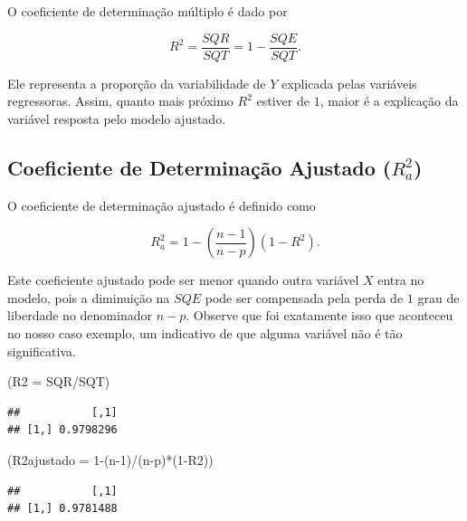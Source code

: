 \documentclass[
]{book}
\newenvironment{Shaded}{\begin{snugshade}}{\end{snugshade}}
\newcommand{\AttributeTok}[1]{\textcolor[rgb]{0.77,0.63,0.00}{#1}}
\newcommand{\DecValTok}[1]{\textcolor[rgb]{0.00,0.00,0.81}{#1}}
\newcommand{\NormalTok}[1]{#1}
\newcommand{\SpecialCharTok}[1]{\textcolor[rgb]{0.00,0.00,0.00}{#1}}
\begin{document}
O coeficiente de determinação múltiplo é dado por

\[R^2 = \frac{SQR}{SQT} = 1-\frac{SQE}{SQT}.\]

Ele representa a proporção da variabilidade de \(Y\) explicada pelas variáveis regressoras. Assim, quanto mais próximo \(R^2\) estiver de \(1\), maior é a explicação da variável resposta pelo modelo ajustado.

\hypertarget{coeficiente-de-determinauxe7uxe3o-ajustado-r2_a}{%
\subsection{\texorpdfstring{Coeficiente de Determinação Ajustado (\(R^2_a\))}{Coeficiente de Determinação Ajustado (R\^{}2\_a)}}\label{coeficiente-de-determinauxe7uxe3o-ajustado-r2_a}}

O coeficiente de determinação ajustado é definido como

\[R^2_a=1-\left(\frac{n-1}{n-p}\right)(1-R^2).\]

Este coeficiente ajustado pode ser menor quando outra variável \(X\) entra no modelo, pois a diminuição na \(SQE\) pode ser compensada pela perda de \(1\) grau de liberdade no denominador \(n-p\). Observe que foi exatamente isso que aconteceu no nosso caso exemplo, um indicativo de que alguma variável não é tão significativa.

\begin{Shaded}
\begin{Highlighting}[]
\NormalTok{(}\AttributeTok{R2 =}\NormalTok{ SQR}\SpecialCharTok{/}\NormalTok{SQT)}
\end{Highlighting}
\end{Shaded}

\begin{verbatim}
##           [,1]
## [1,] 0.9798296
\end{verbatim}

\begin{Shaded}
\begin{Highlighting}[]
\NormalTok{(}\AttributeTok{R2ajustado =} \DecValTok{1}\SpecialCharTok{{-}}\NormalTok{(n}\DecValTok{{-}1}\NormalTok{)}\SpecialCharTok{/}\NormalTok{(n}\SpecialCharTok{{-}}\NormalTok{p)}\SpecialCharTok{*}\NormalTok{(}\DecValTok{1}\SpecialCharTok{{-}}\NormalTok{R2))}
\end{Highlighting}
\end{Shaded}

\begin{verbatim}
##           [,1]
## [1,] 0.9781488
\end{verbatim}
\end{document}
